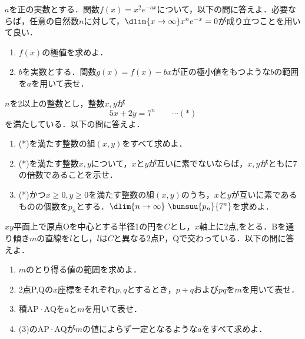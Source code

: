 \begin{problem}
$a$を正の実数とする．関数$f(x) = x^2 e^{-ax}$について，以下の問に答えよ．必要ならば，任意の自然数$n$に対して，$\dlim{x \to \infty} x^n e^{-x} = 0$が成り立つことを用いて良い．
\begin{enumerate}
  \item $f(x)$の極値を求めよ．
  \item $b$を実数とする．関数$g(x) = f(x) - bx$が正の極小値をもつような$b$の範囲を$a$を用いて表せ．
\end{enumerate}
\end{problem}

\begin{problem}
$n$を2以上の整数とし，整数$x,y$が
\[ 5x + 2y = 7^n \qquad \cdots (*)\]
を満たしている．以下の問に答えよ．
\begin{enumerate}
  \item (*)を満たす整数の組$(x,y)$をすべて求めよ．
  \item (*)を満たす整数$x,y$について，$x$と$y$が互いに素でないならば，$x,y$がともに7の倍数であることを示せ．
  \item (*)かつ$x \geq 0, y \geq 0$を満たす整数の組$(x,y)$のうち，$x$と$y$が互いに素であるものの個数を$p_n$とする．$\dlim{n \to \infty}\ \bunsuu{p_n}{7^n}$を求めよ．
\end{enumerate}
\end{problem}

\begin{problem}
$xy$平面上で原点Oを中心とする半径1の円を$C$とし，$x$軸上に2点,をとる．Bを通り傾き$m$の直線を$l$とし，$l$は$C$と異なる2点P，Qで交わっている．以下の問に答えよ．
\begin{enumerate}
  \item $m$のとり得る値の範囲を求めよ．
  \item 2点P,Qの$x$座標をそれぞれ$p,q$とするとき，$p+q$および$pq$を$m$を用いて表せ．
  \item 積$\mathrm{AP} \cdot \mathrm{AQ}$を$a$と$m$を用いて表せ．
  \item (3)の$\mathrm{AP} \cdot \mathrm{AQ}$が$m$の値によらず一定となるような$a$をすべて求めよ．
\end{enumerate}
\end{problem}

